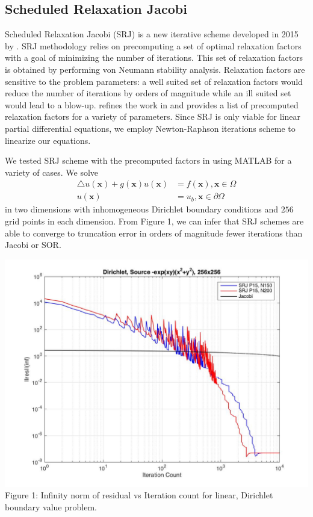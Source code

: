 \documentclass[12pt]{article}
\begin{document}
\begin{multicols}{2}
\section{Scheduled Relaxation Jacobi}

Scheduled Relaxation Jacobi (SRJ) is a new iterative scheme developed in 2015 by \cite{1}. SRJ methodology relies on precomputing a set of optimal relaxation factors with a goal of minimizing the number of iterations. This set of relaxation factors is obtained by performing von Neumann stability analysis. Relaxation factors are sensitive to the problem parameters: a well suited set of relaxation factors would reduce the number of iterations by orders of magnitude while an ill suited set would lead to a blow-up. \cite{2} refines the work in \cite{1} and provides a list of precomputed relaxation factors for a variety of parameters. Since SRJ is only viable for linear partial differential equations, we employ Newton-Raphson iterations scheme to linearize our equations.

We tested SRJ scheme with the precomputed factors in \cite{2} using MATLAB for a variety of cases. We solve
\begin{align}
    \triangle u(\mathbf{x}) + g(\mathbf{x}) u(\mathbf{x}) &= f(\mathbf{x}), \mathbf{x}\in\Omega \\
    u(\mathbf{x}) &= u_b, \mathbf{x}\in\partial\Omega
\end{align}
in two dimensions with inhomogeneous Dirichlet boundary conditions and $256$ grid points in each dimension. From Figure 1, we can infer that SRJ schemes are able to converge to truncation error in orders of magnitude fewer iterations than Jacobi or SOR.
\begin{center}
    \includegraphics[scale=0.2]{exp(xy).jpg}
    \small{Figure 1: Infinity norm of residual vs Iteration count for linear, Dirichlet boundary value problem.}
\end{center}



\end{multicols}
\end{document}
